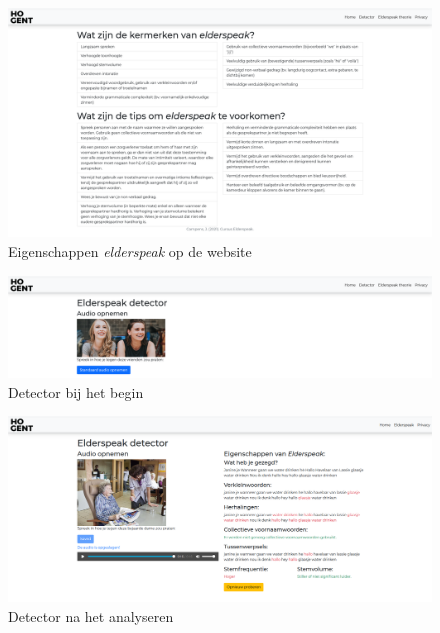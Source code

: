 \begin{figure}
    \centering
    \includegraphics[width=1\textwidth]{./img/eigenschappen_elderspeak_website}
    \caption{\label{fig:eigenschappen_page} Eigenschappen \textit{elderspeak} op de website}
\end{figure}

\begin{figure}
    \centering
    \includegraphics[width=1\textwidth]{./img/detector_begin_elderspeak}
    \caption{\label{fig:detector_begin_page} Detector bij het begin}
\end{figure}

\begin{figure}
    \centering
    \includegraphics[width=1\textwidth]{./img/dector_na_detecteren}
    \caption{\label{fig:detector_end_page} Detector na het analyseren}
\end{figure}


